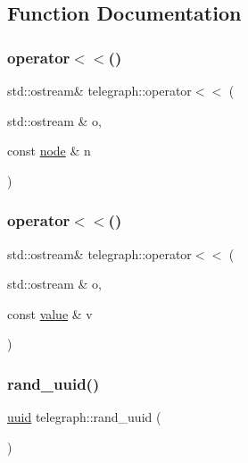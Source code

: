 \subsection{Function Documentation}
\mbox{\label{namespacetelegraph_a628bfaad5d5f57930fae7a3fddab685c}} 
\subsubsection{\texorpdfstring{operator$<$$<$()}{operator<<()}\hspace{0.1cm}{\footnotesize\ttfamily [1/2]}}
{\footnotesize\ttfamily std\+::ostream\& telegraph\+::operator$<$$<$ (\begin{DoxyParamCaption}\item[{std\+::ostream \&}]{o,  }\item[{const \hyperlink{classtelegraph_1_1node}{node} \&}]{n }\end{DoxyParamCaption})\hspace{0.3cm}{\ttfamily [inline]}}

\mbox{\label{namespacetelegraph_af98f82e1c03798a66c7905e7ae17c5c0}} 
\subsubsection{\texorpdfstring{operator$<$$<$()}{operator<<()}\hspace{0.1cm}{\footnotesize\ttfamily [2/2]}}
{\footnotesize\ttfamily std\+::ostream\& telegraph\+::operator$<$$<$ (\begin{DoxyParamCaption}\item[{std\+::ostream \&}]{o,  }\item[{const \hyperlink{classtelegraph_1_1value}{value} \&}]{v }\end{DoxyParamCaption})\hspace{0.3cm}{\ttfamily [inline]}}

\mbox{\label{namespacetelegraph_aba245ee65da02fc6a1ff4b055d460598}} 
\subsubsection{\texorpdfstring{rand\+\_\+uuid()}{rand\_uuid()}}
{\footnotesize\ttfamily \hyperlink{namespacetelegraph_a51ee91d7eaeef067f7ccac2b170e5d59}{uuid} telegraph\+::rand\+\_\+uuid (\begin{DoxyParamCaption}{ }\end{DoxyParamCaption})\hspace{0.3cm}{\ttfamily [inline]}}

